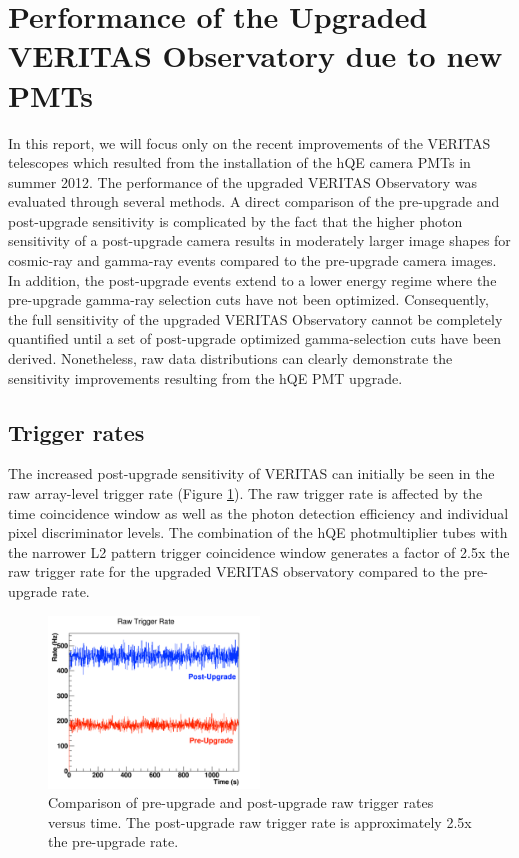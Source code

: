 \documentclass[a4paper]{article}
\begin{document}
\section{Performance of the Upgraded VERITAS Observatory due to new PMTs}
In this report, we will focus only on the recent improvements of the VERITAS telescopes
which resulted from the installation of the hQE camera PMTs in summer 2012. 
The performance of the upgraded VERITAS Observatory was evaluated through several methods. 
A direct comparison of the pre-upgrade and post-upgrade sensitivity is complicated by the fact that the higher photon sensitivity of a post-upgrade camera results in moderately larger image shapes for cosmic-ray and gamma-ray events compared to the pre-upgrade camera images.  In addition, the post-upgrade events extend to a lower energy regime where the pre-upgrade gamma-ray selection cuts have not been optimized. Consequently, the full sensitivity of the upgraded VERITAS Observatory cannot be completely quantified until a set of post-upgrade optimized gamma-selection cuts have been derived. Nonetheless, raw data distributions can clearly demonstrate the sensitivity improvements resulting from the hQE PMT upgrade.  
 
\subsection{Trigger rates}
The increased post-upgrade sensitivity of  VERITAS can initially be seen in the raw array-level trigger rate  (Figure \ref{PrettyRates}). The raw trigger rate is affected by the time coincidence window as well as the photon detection efficiency and individual pixel discriminator levels. The combination of the hQE photmultiplier tubes with the narrower L2 pattern trigger coincidence window generates a factor of 2.5x the raw trigger rate for the upgraded VERITAS observatory compared to the pre-upgrade rate.

 \begin{figure}[tpb]
  \centering
  \includegraphics[width=0.5\textwidth]{icrc2013-06}
  \caption{Comparison of pre-upgrade and post-upgrade raw trigger rates versus time. The post-upgrade raw trigger rate is approximately 2.5x the pre-upgrade rate.}
  \label{PrettyRates}
 \end{figure}
\end{document}
